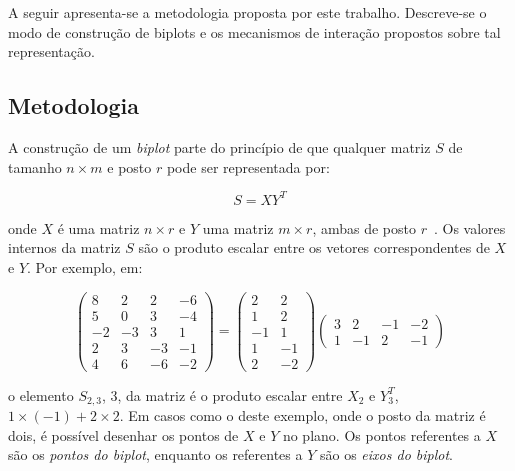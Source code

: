 A seguir apresenta-se a metodologia proposta por este
trabalho. Descreve-se o modo de construção de biplots
e os mecanismos de interação propostos sobre tal representação.

\subsection{Metodologia}

A construção de um \emph{biplot} parte do princípio de que qualquer
matriz $S$ de tamanho $n \times m$ e posto $r$  pode
ser representada por:

\begin{equation}\label{eq:bp}
    S = XY^T
\end{equation}

onde $X$ é uma matriz $n \times r$ e $Y$ uma matriz $m
\times r$, ambas de posto $r$~\cite{Gabriel1971}. Os valores
internos da matriz $S$ são o produto escalar entre os
vetores correspondentes de $X$ e $Y$. Por exemplo, em:

\begin{equation}
    \left( \begin{array}{rrrr}
        8 &  2 &  2 & -6 \\
        5 &  0 &  3 & -4 \\
       -2 & -3 &  3 &  1 \\
            2 &  3 & -3 & -1 \\
        4 &  6 & -6 & -2\end{array}
\right) = \left( \begin{array}{rr}
         2 & 2 \\
         1 & 2 \\
        -1 & 1 \\
         1 & -1 \\
         2 & -2\end{array} 
\right) \left( \begin{array}{rrrr}
        3 &  2 &-1 & -2 \\
    1 & -1 & 2 & -1 \end{array} 
\right)
\end{equation}

o elemento $S_{2,3}$, 3, da matriz é o
produto escalar entre $X_2$ e $Y^T_3$, $1 \times \left( -1
\right) + 2 \times 2$. Em casos como o deste
exemplo, onde o posto da matriz é dois, é possível desenhar os
pontos de $X$ e $Y$ no plano. Os pontos referentes a $X$ são
os \emph{pontos do biplot}, enquanto os referentes a $Y$ são
os \emph{eixos do biplot}.

